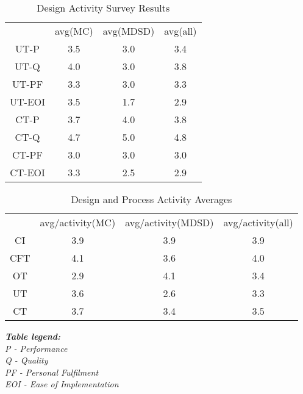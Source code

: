 \documentclass[final_report_innit.tex]{subfiles}
\newcommand\Tstrut{\rule{0pt}{2.6ex}}       %
\begin{document}
\begin{table}[h]
	\caption{Design Activity Survey Results}
	\begin{center}
		\begin{tabular}{cccc}
		           & avg(MC) & avg(MDSD) & avg(all) \Tstrut \\ 
			UT-P   & 3.5 & 3.0 & 3.4 \Tstrut \\  
			UT-Q   & 4.0 & 3.0 & 3.8 \Tstrut \\ 
			UT-PF  & 3.3 & 3.0 & 3.3 \Tstrut \\ 
			UT-EOI & 3.5 & 1.7 & 2.9 \Tstrut \\ 
			CT-P   & 3.7 & 4.0 & 3.8 \Tstrut \\ 
			CT-Q   & 4.7 & 5.0 & 4.8 \Tstrut \\ 
			CT-PF  & 3.0 & 3.0 & 3.0 \Tstrut \\ 
			CT-EOI & 3.3 & 2.5 & 2.9 \Tstrut \\ 
		\end{tabular}
	\end{center}
\end{table}


\begin{table}[h]
	\caption{Design and Process Activity Averages}
	\begin{center}
		\begin{tabular}{cccc}
		           & avg/activity(MC) & avg/activity(MDSD) & avg/activity(all) \Tstrut \\ 
			CI  & 3.9 & 3.9 & 3.9 \Tstrut \\  
			CFT & 4.1 & 3.6 & 4.0 \Tstrut \\ 
			OT  & 2.9 & 4.1 & 3.4 \Tstrut \\ 
			UT  & 3.6 & 2.6 & 3.3 \Tstrut \\ 
			CT  & 3.7 & 3.4 & 3.5 \Tstrut \\ 

		\end{tabular}
	\end{center}
\end{table}

\smallskip
\smallskip
\smallskip
\smallskip
\smallskip
\smallskip


\noindent
\textit{
\textbf{\hspace{12 mm}Table legend:}
\\
\hspace*{13 mm}P - Performance
\\
\hspace*{13 mm}Q - Quality
\\
\hspace*{13 mm}PF - Personal Fulfilment
\\
\hspace*{13 mm}EOI - Ease of Implementation
}
\end{document}
